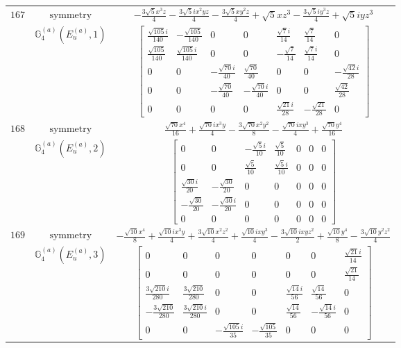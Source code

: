\documentclass[fleqn,8pt,landscape]{jsarticle}
\begin{document}
\begin{longtable}{ccc}
$ 167 $ & $ \text{symmetry} $ & $ - \frac{3 \sqrt{5} x^{3} z}{4} - \frac{3 \sqrt{5} i x^{2} y z}{4} - \frac{3 \sqrt{5} x y^{2} z}{4} + \sqrt{5} x z^{3} - \frac{3 \sqrt{5} i y^{3} z}{4} + \sqrt{5} i y z^{3} $ \\
$  $ & $ \mathbb{G}_{4}^{(a)}(E_{u}^{(a)},1) $ & $ \begin{bmatrix} \frac{\sqrt{105} i}{140} & - \frac{\sqrt{105}}{140} & 0 & 0 & \frac{\sqrt{7} i}{14} & \frac{\sqrt{7}}{14} & 0 \\ \frac{\sqrt{105}}{140} & \frac{\sqrt{105} i}{140} & 0 & 0 & - \frac{\sqrt{7}}{14} & \frac{\sqrt{7} i}{14} & 0 \\ 0 & 0 & - \frac{\sqrt{70} i}{40} & \frac{\sqrt{70}}{40} & 0 & 0 & - \frac{\sqrt{42} i}{28} \\ 0 & 0 & - \frac{\sqrt{70}}{40} & - \frac{\sqrt{70} i}{40} & 0 & 0 & \frac{\sqrt{42}}{28} \\ 0 & 0 & 0 & 0 & \frac{\sqrt{21} i}{28} & - \frac{\sqrt{21}}{28} & 0 \end{bmatrix} $ \\ \hline
$ 168 $ & $ \text{symmetry} $ & $ \frac{\sqrt{70} x^{4}}{16} + \frac{\sqrt{70} i x^{3} y}{4} - \frac{3 \sqrt{70} x^{2} y^{2}}{8} - \frac{\sqrt{70} i x y^{3}}{4} + \frac{\sqrt{70} y^{4}}{16} $ \\
$  $ & $ \mathbb{G}_{4}^{(a)}(E_{u}^{(a)},2) $ & $ \begin{bmatrix} 0 & 0 & - \frac{\sqrt{5} i}{10} & \frac{\sqrt{5}}{10} & 0 & 0 & 0 \\ 0 & 0 & \frac{\sqrt{5}}{10} & \frac{\sqrt{5} i}{10} & 0 & 0 & 0 \\ \frac{\sqrt{30} i}{20} & - \frac{\sqrt{30}}{20} & 0 & 0 & 0 & 0 & 0 \\ - \frac{\sqrt{30}}{20} & - \frac{\sqrt{30} i}{20} & 0 & 0 & 0 & 0 & 0 \\ 0 & 0 & 0 & 0 & 0 & 0 & 0 \end{bmatrix} $ \\ \hline
$ 169 $ & $ \text{symmetry} $ & $ - \frac{\sqrt{10} x^{4}}{8} + \frac{\sqrt{10} i x^{3} y}{4} + \frac{3 \sqrt{10} x^{2} z^{2}}{4} + \frac{\sqrt{10} i x y^{3}}{4} - \frac{3 \sqrt{10} i x y z^{2}}{2} + \frac{\sqrt{10} y^{4}}{8} - \frac{3 \sqrt{10} y^{2} z^{2}}{4} $ \\
$  $ & $ \mathbb{G}_{4}^{(a)}(E_{u}^{(a)},3) $ & $ \begin{bmatrix} 0 & 0 & 0 & 0 & 0 & 0 & \frac{\sqrt{21} i}{14} \\ 0 & 0 & 0 & 0 & 0 & 0 & \frac{\sqrt{21}}{14} \\ \frac{3 \sqrt{210} i}{280} & \frac{3 \sqrt{210}}{280} & 0 & 0 & \frac{\sqrt{14} i}{56} & \frac{\sqrt{14}}{56} & 0 \\ - \frac{3 \sqrt{210}}{280} & \frac{3 \sqrt{210} i}{280} & 0 & 0 & \frac{\sqrt{14}}{56} & - \frac{\sqrt{14} i}{56} & 0 \\ 0 & 0 & - \frac{\sqrt{105} i}{35} & - \frac{\sqrt{105}}{35} & 0 & 0 & 0 \end{bmatrix} $ \\ \hline

\end{longtable}
\end{document}
